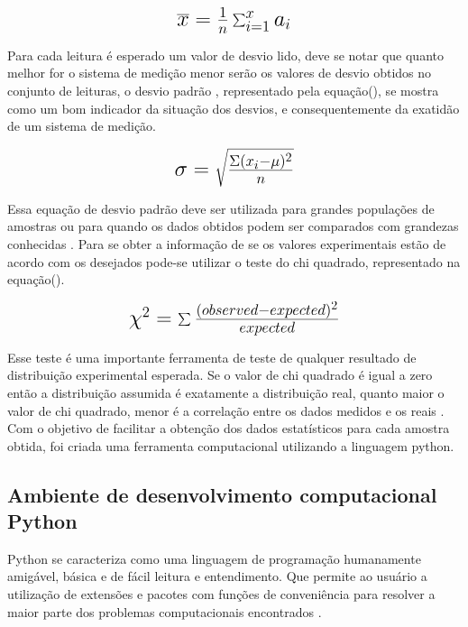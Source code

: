 \begin{equation}\label{eq:Eq_220}%
\mbox{\fontsize{17.28}{21.6}\selectfont\( %
\overline{x} = {\frac {1}{n}}\sum _{i=1}^{x}a_{i}
\)} %
\end{equation}

\hfill

Para cada leitura é esperado um valor de desvio lido, deve se notar que quanto melhor for o sistema de medição menor serão os valores de desvio obtidos no conjunto de leituras, o desvio padrão , representado pela equação(), se mostra como um bom indicador da situação dos desvios, e consequentemente da exatidão de um sistema de medição.

\begin{equation}\label{eq:Eq_220}%
\mbox{\fontsize{17.28}{21.6}\selectfont\( %
\sigma = \sqrt{\frac{\Sigma(x_i-\mu)^{2}}{n}}
\)} %
\end{equation}

\hfill

Essa equação de desvio padrão deve ser utilizada para grandes populações de amostras ou para quando os dados obtidos podem ser comparados com grandezas conhecidas \autocite{Hollman2011}. Para se obter a informação de se os valores experimentais estão de acordo com os desejados pode-se utilizar o teste do chi quadrado, representado na equação().

\begin{equation}\label{eq:Eq_220}%
\mbox{\fontsize{17.28}{21.6}\selectfont\( %
\chi^{2} = \sum{\frac{(observed - expected)^{2}}{expected}}
\)} %
\end{equation}

\hfill

Esse teste é uma importante ferramenta de teste de qualquer resultado de distribuição experimental esperada. Se o valor de chi quadrado é igual a zero então a distribuição assumida é exatamente a distribuição real, quanto maior o valor de chi quadrado, menor é a correlação entre os dados medidos e os reais \autocite{Hollman2011}. Com o objetivo de facilitar a obtenção dos dados estatísticos para cada amostra obtida, foi criada uma ferramenta computacional utilizando a linguagem python.

\subsection{Ambiente de desenvolvimento computacional Python}

Python se caracteriza como uma linguagem de programação humanamente amigável, básica e de fácil leitura e entendimento. Que permite ao usuário a utilização de extensões e pacotes com funções de conveniência para resolver a maior parte dos problemas computacionais encontrados \autocite{TimHall2010}.

